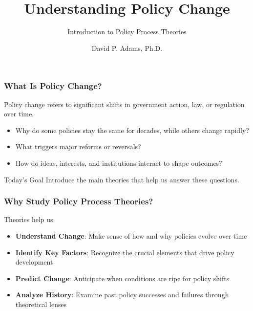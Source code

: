 \documentclass[10pt]{beamer}
\begin{document}
\title{Understanding Policy Change}
\subtitle{Introduction to Policy Process Theories}
\author{David P. Adams, Ph.D.}
\date{}

\maketitle

\begin{frame}
\frametitle{What Is Policy Change?}

Policy change refers to significant shifts in government action, law, or regulation over time.

\vspace{0.5cm}

\begin{itemize}
  \item Why do some policies stay the same for decades, while others change rapidly?
  \item What triggers major reforms or reversals?
  \item How do ideas, interests, and institutions interact to shape outcomes?
\end{itemize}

\vspace{0.5cm}

\begin{alertblock}{Today's Goal}
Introduce the main theories that help us answer these questions.
\end{alertblock}

\end{frame}

\begin{frame}
\frametitle{Why Study Policy Process Theories?}

Theories help us:

\begin{itemize}
  \item \textbf{Understand Change}: Make sense of how and why policies evolve over time
  \item \textbf{Identify Key Factors}: Recognize the crucial elements that drive policy development  
  \item \textbf{Predict Change}: Anticipate when conditions are ripe for policy shifts
  \item \textbf{Analyze History}: Examine past policy successes and failures through theoretical lenses
\end{itemize}

\end{frame}
\end{document}
